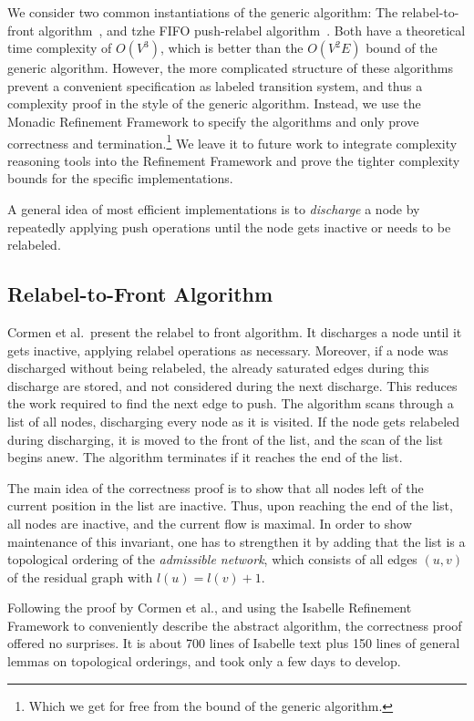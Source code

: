 \documentclass[smallcondensed]{svjour3}     %
\begin{document}
We consider two common instantiations of the generic algorithm: The relabel-to-front algorithm~\cite{CLRS09}, and tzhe FIFO push-relabel algorithm~\cite{GoTa88}.
Both have a theoretical time complexity of $O(V^3)$, which is better than the $O(V^2E)$ bound of the generic algorithm.
However, the more complicated structure of these algorithms prevent a convenient specification as labeled transition system, and thus 
a complexity proof in the style of the generic algorithm.
Instead, we use the Monadic Refinement Framework to specify the algorithms and only prove correctness and 
termination.\footnote{Which we get for free from the bound of the generic algorithm.} We leave it to future work to integrate complexity reasoning tools into 
the Refinement Framework and prove the tighter complexity bounds for the specific implementations.

A general idea of most efficient implementations is to \emph{discharge} a node by repeatedly applying push operations until the node gets inactive or needs to be relabeled.

\subsection{Relabel-to-Front Algorithm}
Cormen et al.\ present the relabel to front algorithm.
It discharges a node until it gets inactive, applying relabel operations as necessary. 
Moreover, if a node was discharged without being relabeled, the already saturated edges during this discharge are stored, and not considered 
during the next discharge. This reduces the work required to find the next edge to push.
The algorithm scans through a list of all nodes, discharging every node as it is visited.
If the node gets relabeled during discharging, it is moved to the front of the list, and the scan of the list begins anew.
The algorithm terminates if it reaches the end of the list. 

The main idea of the correctness proof is to show that all nodes left of 
the current position in the list are inactive. Thus, upon reaching the end of the list, all nodes are inactive, and the current flow is maximal.
In order to show maintenance of this invariant, one has to strengthen it by adding that the list is a topological ordering of the 
\emph{admissible network}, which consists of all edges $(u,v)$ of the residual graph with $l(u) = l(v) + 1$. 

Following the proof by Cormen et al., and using the Isabelle Refinement Framework to conveniently describe the abstract algorithm,
the correctness proof offered no surprises. It is about 700 lines of Isabelle text plus 150 lines of general lemmas on topological orderings, 
and took only a few days to develop.
\end{document}
